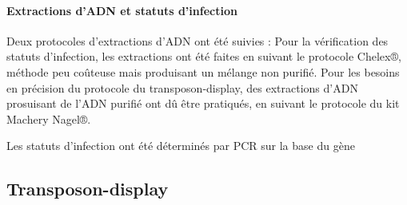 	\paragraph{Extractions d'ADN et statuts d'infection} %
	\label{par:extractions_et_statuts_d_infection}
	Deux protocoles d'extractions d'ADN ont été suivies : 
	Pour la vérification des statuts d'infection, les extractions ont été faites en suivant le protocole Chelex®, méthode peu coûteuse mais produisant un mélange non purifié.
	Pour les besoins en précision du protocole du transposon-display, des extractions d'ADN prosuisant de l'ADN purifié ont dû être pratiqués, en suivant le protocole du kit Machery Nagel®.

	Les statuts d'infection ont été déterminés par PCR sur la base du gène 


\subsection{Transposon-display} %
\label{sub:transposon_display}


